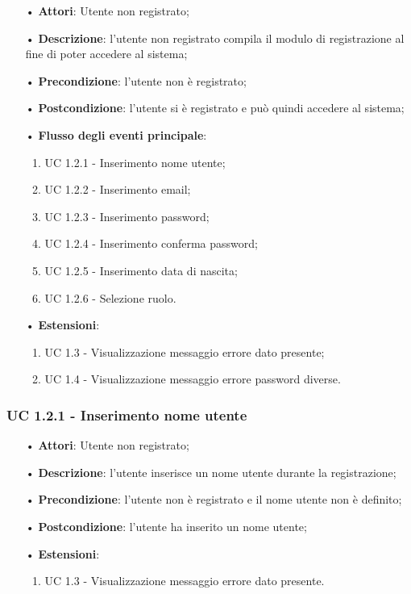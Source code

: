 \begin{itemize}
	\item[•]\textbf{Attori}: Utente non registrato;
	\item[•]\textbf{Descrizione}: l'utente non registrato compila il modulo di registrazione al fine di poter accedere al sistema;
	\item[•]\textbf{Precondizione}: l'utente non è registrato;
	\item[•]\textbf{Postcondizione}: l'utente si è registrato e può quindi accedere al sistema;
	\item[•]\textbf{Flusso degli eventi principale}:
	\begin{enumerate}
		\item UC 1.2.1 - Inserimento nome utente;
		\item UC 1.2.2 - Inserimento email;
		\item UC 1.2.3 - Inserimento password;
		\item UC 1.2.4 - Inserimento conferma password;
		\item UC 1.2.5 - Inserimento data di nascita;
		\item UC 1.2.6 - Selezione ruolo.
	\end{enumerate}
	\item[•]\textbf{Estensioni}:
	\begin{enumerate}
		\item UC 1.3 - Visualizzazione messaggio errore dato presente;
		\item UC 1.4 - Visualizzazione messaggio errore password diverse.
	\end{enumerate}
\end{itemize}

\subsubsection{UC 1.2.1 - Inserimento nome utente}
\begin{itemize}
	\item[•]\textbf{Attori}: Utente non registrato;
	\item[•]\textbf{Descrizione}: l'utente inserisce un nome utente durante la registrazione;
	\item[•]\textbf{Precondizione}: l'utente non è registrato e il nome utente non è definito;
	\item[•]\textbf{Postcondizione}: l'utente ha inserito un nome utente;
	\item[•] \textbf{Estensioni}:
	\begin{enumerate}
		\item UC 1.3 - Visualizzazione messaggio errore dato presente.
	\end{enumerate}
\end{itemize}

